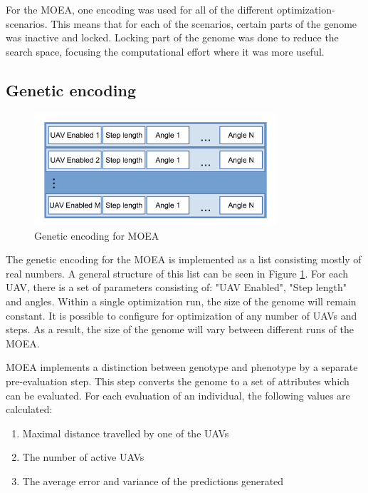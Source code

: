 \documentclass[10pt,a4paper]{book}
\begin{document}
For the \gls{MOEA}, one encoding was used for all of the different optimization-scenarios. This means that for each of the scenarios, certain parts of the genome was inactive and locked. Locking part of the genome was done to reduce the search space, focusing the computational effort where it was more useful.

\newpage


\subsection{Genetic encoding}


\begin{figure}[htp]
\centering
\includegraphics[width=90mm]{Moeaencoding.pdf}
\caption{Genetic encoding for \gls{MOEA}}
\label{encodingmoea}
\end{figure}

The genetic encoding for the \gls{MOEA} is implemented as a list consisting mostly of real numbers. A general structure of this list can be seen in Figure \ref{encodingmoea}. For each \gls{UAV}, there is a set of parameters consisting of: "\gls{UAV} Enabled", "Step length" and angles. Within a single optimization run, the size of the genome will remain constant. It is possible to configure for optimization of any number of \glspl{UAV} and steps. As a result, the size of the genome will vary between different runs of the \gls{MOEA}. 

\Gls{MOEA} implements a distinction between genotype and phenotype by a separate pre-evaluation step. This step converts the genome to a set of attributes which can be evaluated. For each evaluation of an individual, the following values are calculated: 

\begin{enumerate}
\item Maximal distance travelled by one of the \glspl{UAV}
\item The number of active \glspl{UAV}
\item The average error and variance of the predictions generated
\end{enumerate}
\end{document}

